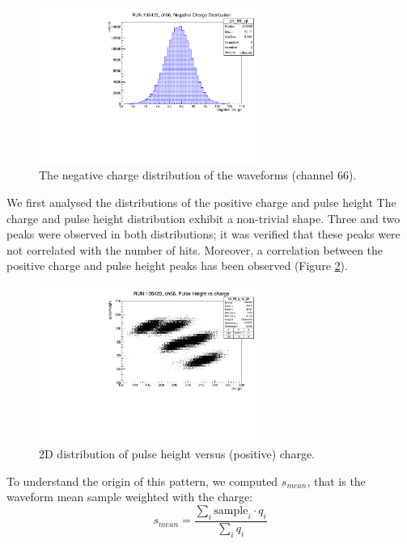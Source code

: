 \begin{figure}[!h]
    \centering
    \includegraphics[width=0.65\textwidth]{figures/pdf/negcharge.pdf}
    \caption[The negative charge distribution of the waveforms.]{The negative charge distribution of the waveforms (channel 66).}
    \label{fig:nch2}
\end{figure}
We first analysed the distributions 
of the positive charge and pulse height   
The charge and pulse height distribution 
exhibit a non-trivial shape. 
Three and two peaks were observed in both distributions; 
it was verified that these peaks were not correlated with 
the number of hits. Moreover, a 
correlation between the positive charge and pulse 
height peaks has been observed (Figure \ref{fig:chvsph}). 
\begin{figure}[!h]
  \centering
  \includegraphics[width=0.65\textwidth]{figures/pdf/phch1.pdf}
  \caption[The 2D distribution of pulse height versus (positive) charge.]{2D distribution of pulse height versus (positive) charge.}
  \label{fig:chvsph}
\end{figure}
To understand the origin of this pattern, we computed $s_{mean}$, 
that is the waveform mean sample weighted with the charge: 
\begin{equation} 
  s_{mean} = \frac{\sum_i \text{sample}_i \cdot q_i }{\sum_i q_i} 
\end{equation}
